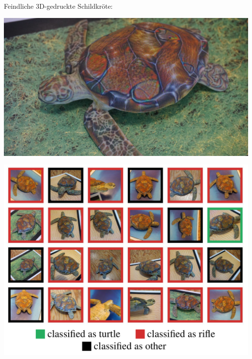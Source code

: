 \documentclass[aspectratio=169,usenames,dvipsnames]{beamer}
\begin{document}
\begin{frame}

\begin{center}
Feindliche 3D-gedruckte Schildkröte:
\end{center}

\begin{center}
\includegraphics[height=0.7\textheight,keepaspectratio]{images/rifle_turtle.jpg} 
\end{center}
\end{frame}

\begin{frame}
\begin{center}
\includegraphics[height=0.9\textheight,keepaspectratio]{images/turtle_class} 
\end{center}
\end{frame}
\end{document}
